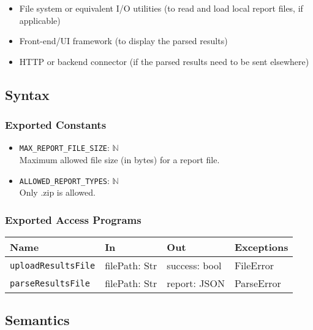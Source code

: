 \documentclass[12pt, titlepage]{article}
\begin{document}
\begin{itemize}
    \item File system or equivalent I/O utilities (to read and load local report files, if applicable)
    \item Front-end/UI framework (to display the parsed results)
    \item HTTP or backend connector (if the parsed results need to be sent elsewhere)
\end{itemize}

\subsection{Syntax}

\subsubsection{Exported Constants}

\begin{itemize}
    \item \texttt{MAX\_REPORT\_FILE\_SIZE}: $\mathbb{N}$ \\
     Maximum allowed file size (in bytes) for a report file.
    \item \texttt{ALLOWED\_REPORT\_TYPES}: $\mathbb{N}$ \\
     Only .zip is allowed.
\end{itemize}

\subsubsection{Exported Access Programs}

\begin{center}
\begin{tabular}{p{5cm} p{3.5cm} p{3.5cm} p{2cm}}
\hline
\textbf{Name} & \textbf{In} & \textbf{Out} & \textbf{Exceptions} \\
\hline
\texttt{uploadResultsFile} & filePath: Str & success: bool & FileError \\
\texttt{parseResultsFile} & filePath: Str & report: JSON & ParseError \\
\hline
\end{tabular}
\end{center}

\subsection{Semantics}
\end{document}
